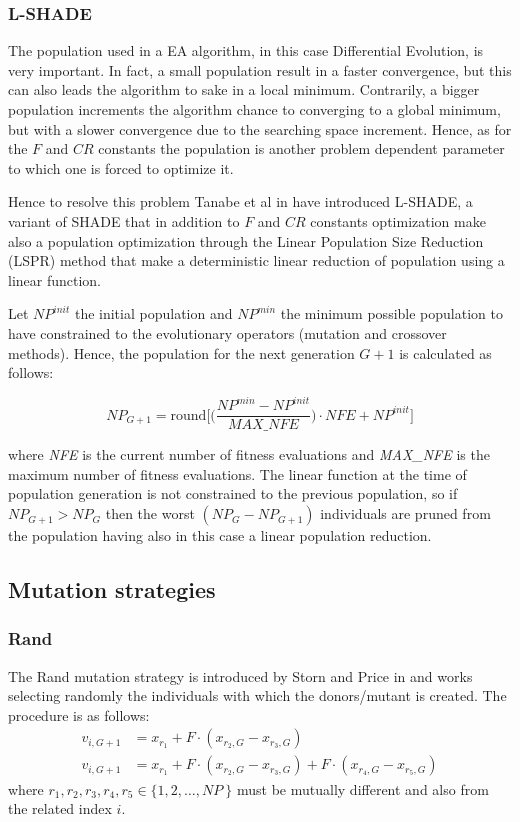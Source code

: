 \subsubsection{L-SHADE}
The population used in a EA algorithm, in this case Differential Evolution, is very important. In fact, a small population result in a faster convergence, but this can also leads the algorithm to sake in a local minimum. Contrarily, a bigger population increments the algorithm chance to converging to a global minimum, but with a slower convergence due to the searching space increment. Hence, as for the $F$ and $\textit{CR}$ constants the population is another problem dependent parameter to which one is forced to optimize it.

Hence to resolve this problem Tanabe et al in \cite{LSHADE:2014} have introduced L-SHADE, a variant of SHADE that in addition to $F$ and $\textit{CR}$ constants optimization make also a population optimization through the Linear Population Size Reduction (LSPR) method that make a deterministic linear reduction of population using a linear function. 

Let $\textit{NP}^{\textit{init}}$ the initial population and $\textit{NP}^{\textit{min}}$ the minimum possible population to have constrained to the evolutionary operators (mutation and crossover methods). Hence, the population for the next generation $G + 1$ is calculated as follows:
\begin{center}
	\begin{equation}
		\textit{NP}_{G + 1} = \textrm{round}\Bigg[\Bigg(\frac{\textit{NP}^{\textit{min}} - \textit{NP}^{\textit{init}}}{\textit{MAX\_NFE}} \Bigg) \cdot \textit{NFE} + \textit{NP}^{\textit{init}} \Bigg]
	\end{equation}
\end{center}
where \textit{NFE} is the current number of fitness evaluations and \textit{MAX\_NFE} is the maximum number of fitness evaluations. The linear function at the time of population generation is not constrained to the previous population, so if $\textit{NP}_{G + 1} > \textit{NP}_{G}$ then the worst $(\textit{NP}_{G} - \textit{NP}_{G+1})$ individuals are pruned from the population having also in this case a linear population reduction.
\subsection{Mutation strategies}

\subsubsection{Rand}
The Rand mutation strategy is introduced by Storn and Price in \cite{DESEHGOCS:1997} and works selecting randomly the individuals with which the donors/mutant is created. The procedure is as follows:
\begin{align}
	v_{i, G + 1} &= x_{r_{1}} + F \cdot (x_{r_2, G} - x_{r_3, G}) \\
	v_{i, G + 1} &= x_{r_{1}} + F \cdot (x_{r_2, G} - x_{r_3, G}) + F \cdot (x_{r_4, G} - x_{r_5, G})
\end{align}
where $r_1, r_2, r_3, r_4, r_5 \in \{1, 2, \dots, \textit{NP}\ \}$ must be mutually different and also from the related index $i$.

